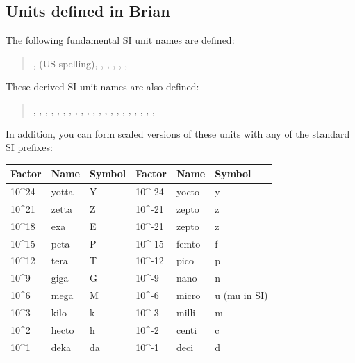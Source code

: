 \documentclass[letterpaper,10pt,english]{manual}
\begin{document}
\subsection{Units defined in Brian}

The following fundamental SI unit names are defined:
\begin{quote}

,  (US spelling), , , , , , 
\end{quote}

These derived SI unit names are also defined:
\begin{quote}

, , , , , , ,
, , , , , , ,
, , , , , , , 
\end{quote}

In addition, you can form scaled versions of these units with any of the standard SI prefixes:

\begin{tabulary}{\textwidth}{|L|L|L|L|L|L|}
\hline
\textbf{
Factor
} & \textbf{
Name
} & \textbf{
Symbol
} & \textbf{
Factor
} & \textbf{
Name
} & \textbf{
Symbol
}\\
\hline

10\textasciicircum{}24
 & 
yotta
 & 
Y
 & 
10\textasciicircum{}-24
 & 
yocto
 & 
y
\\

10\textasciicircum{}21
 & 
zetta
 & 
Z
 & 
10\textasciicircum{}-21
 & 
zepto
 & 
z
\\

10\textasciicircum{}18
 & 
exa
 & 
E
 & 
10\textasciicircum{}-21
 & 
zepto
 & 
z
\\

10\textasciicircum{}15
 & 
peta
 & 
P
 & 
10\textasciicircum{}-15
 & 
femto
 & 
f
\\

10\textasciicircum{}12
 & 
tera
 & 
T
 & 
10\textasciicircum{}-12
 & 
pico
 & 
p
\\

10\textasciicircum{}9
 & 
giga
 & 
G
 & 
10\textasciicircum{}-9
 & 
nano
 & 
n
\\

10\textasciicircum{}6
 & 
mega
 & 
M
 & 
10\textasciicircum{}-6
 & 
micro
 & 
u (mu in SI)
\\

10\textasciicircum{}3
 & 
kilo
 & 
k
 & 
10\textasciicircum{}-3
 & 
milli
 & 
m
\\

10\textasciicircum{}2
 & 
hecto
 & 
h
 & 
10\textasciicircum{}-2
 & 
centi
 & 
c
\\

10\textasciicircum{}1
 & 
deka
 & 
da
 & 
10\textasciicircum{}-1
 & 
deci
 & 
d
\\
\hline
\end{tabulary}
\end{document}
